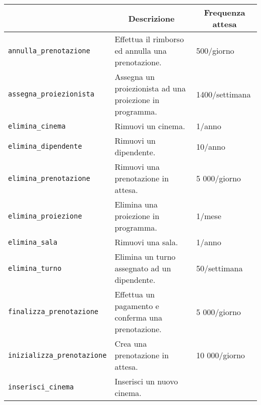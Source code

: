 \begin{longtable}{|p{5.33cm}|p{7.66cm}|p{2.88cm}|}
    \hline
    \rowcolor{tblhdrcolor}
    \multicolumn{1}{|c|}{\textbf{Nome}}                           &
    \multicolumn{1}{|c|}{\textbf{Descrizione}}                    &
    \multicolumn{1}{|c|}{\textbf{Frequenza attesa}}
    \\ \hline
    \verb|annulla_prenotazione|                                   &
    Effettua il rimborso ed annulla una prenotazione.             & %
    500/giorno
    \\ \hline
    \verb|assegna_proiezionista|                                  & %
    Assegna un proiezionista ad una proiezione in programma.      &
    1400/settimana
    \\ \hline
    \verb|elimina_cinema|                                         & %
    Rimuovi un cinema.                                            &
    1/anno
    \\ \hline
    \verb|elimina_dipendente|                                     & %
    Rimuovi un dipendente.                                        &
    10/anno
    \\ \hline
    \verb|elimina_prenotazione|                                   &
    Rimuovi una prenotazione in attesa.                           &
    5 000/giorno
    \\ \hline
    \verb|elimina_proiezione|                                     & %
    Elimina una proiezione in programma.                          &
    1/mese
    \\ \hline
    \verb|elimina_sala|                                           & %
    Rimuovi una sala.                                             &
    1/anno
    \\ \hline
    \verb|elimina_turno|                                          & %
    Elimina un turno assegnato ad un dipendente.                  &
    50/settimana
    \\ \hline
    \verb|finalizza_prenotazione|                                 & %
    Effettua un pagamento e conferma una prenotazione.            &
    5 000/giorno
    \\ \hline
    \verb|inizializza_prenotazione|                               &
    Crea una prenotazione in attesa.                              &
    10 000/giorno
    \\ \hline
    \verb|inserisci_cinema|                                       & %
    Inserisci un nuovo cinema.                                    &

\end{longtable}
